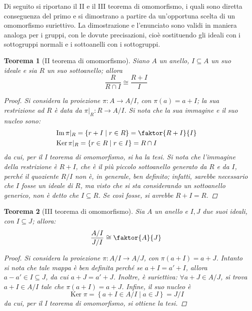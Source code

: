 \documentclass[12pt]{scrartcl}
\theoremstyle{style}
\newtheorem{teorema}{Teorema}[section]
\numberwithin{equation}{subsection}
\begin{document}
\noindent Di seguito si riportano il II e il III teorema di omomorfismo, i quali sono diretta conseguenza del primo e si dimostrano a partire da un'opportuna scelta di un omomorfismo suriettivo.
La dimostrazione e l'enunciato sono validi in maniera analoga per i gruppi, con le dovute precisazioni, cio\`e sostituendo gli ideali con i sottogruppi normali e i sottoanelli con i sottogruppi.
\begin{teorema}
	[II teorema di omomorfismo]
	Siano $A$ un anello, $I\subseteq A$ un suo ideale e sia $R$ un suo sottoanello; allora 
	\[
	 \frac{R}{R\cap I}\cong\frac{R+I}{I}
	\] 
	\begin{proof}
		Si considera la proiezione $\pi : A \to A / I$, con $\pi(a) = a + I$; la sua restrizione ad $R$ \`e data da $\pi|_R : R \to A / I$.
		Si nota che la sua immagine e il suo nucleo sono: 
		\[
			\begin{split}
				&\operatorname{Im} \pi|_R = \left\{ r + I  \mid r \in R \right\} = \faktor{R+I}{I}\\
				&\operatorname{Ker} \pi|_R = \left\{ r \in R  \mid r \in I \right\}  = R \cap I 
			\end{split}
		\] 
		da cui, per il I teorema di omomorfismo, si ha la tesi.
		Si nota che l'immagine della restrizione \`e $R+I$, che \`e il pi\`u piccolo sottoanello generato da $R$ e da $I$, perch\'e il quoziente $R / I$ non \`e, in generale, ben definito; infatti, sarebbe necessario che $I$ fosse un ideale di $R$, ma visto che si sta considerando un sottoanello generico, non \`e detto che $I \subseteq R$. 
		Se cos\`i fosse, si avrebbe $R + I = R$.
	\end{proof}
\end{teorema}
\begin{teorema}
	[III teorema di omomorfismo]
	Sia $A $ un anello e $I,J$ due suoi ideali, con $I \subseteq J$; allora:
	\[
		\frac{A / I }{J / I}\cong \faktor{A}{J}
	\] 
	\begin{proof}
		Si considera la proiezione $\pi : A / I \to A / J$, con $\pi(a+ I) = a + J $.
	Intanto si nota che tale mappa \`e ben definita perch\'e se $a + I = a' + I$, allora $a-a' \in I \subseteq J$, da cui $a + J = a'+ J$.
Inoltre, \`e suriettiva: $\forall a + J \in A / J$, si trova $a +I \in A / I$ tale che $\pi(a+I) = a + J$.
Infine, il suo nucleo \`e 
\[
\operatorname{Ker} \pi = \left\{ a+ I \in A / I  \mid a \in J \right\} = J / I
\] 
da cui, per il I teorema di omomorfismo, si ottiene la tesi.
	\end{proof}
\end{teorema}
\end{document}
